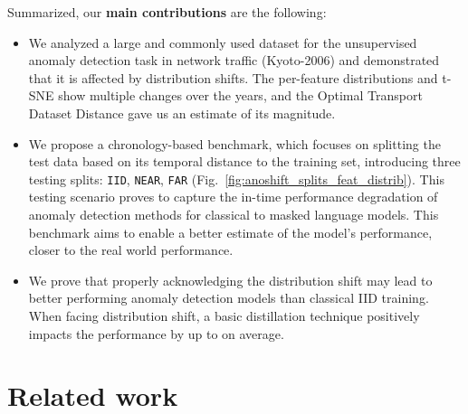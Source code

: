 \documentclass{article}
\begin{document}
Summarized, our \textbf{main contributions} are the following:
\begin{itemize}
\item We analyzed a large and commonly used dataset for the unsupervised anomaly detection task in network traffic (Kyoto-2006\text{+}) and demonstrated that it is affected by distribution shifts. The per-feature distributions and t-SNE show multiple changes over the years, and the Optimal Transport Dataset Distance gave us an estimate of its magnitude.
\item We propose a chronology-based benchmark, which focuses on splitting the test data based on its temporal distance to the training set, introducing three testing splits: \texttt{IID}, \texttt{NEAR}, \texttt{FAR} (Fig.~\ref{fig:anoshift_splits_feat_distrib}). This testing scenario proves to capture the in-time performance degradation of anomaly detection methods for classical to masked language models. This benchmark aims to enable a better estimate of the model's performance, closer to the real world performance. 
\item We prove that properly acknowledging the distribution shift may lead to better performing anomaly detection models than classical IID training. When facing distribution shift, a basic distillation technique positively impacts the performance by up to  on average.
\end{itemize}



\section{Related work}
\end{document}
